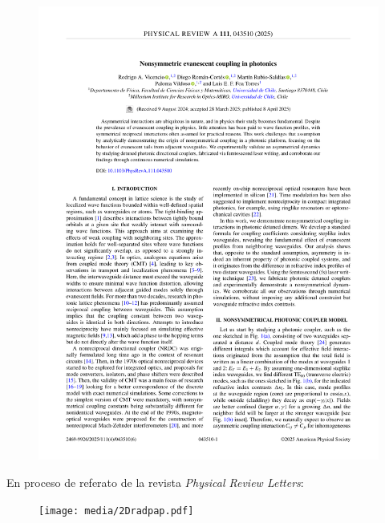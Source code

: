 \begin{figure}[H]
	\centering
	\includegraphics[page=1, width=\linewidth]{media/nonsympap.pdf}
\end{figure}
\newpage
En proceso de referato de la revista \textit{Physical Review Letters}:
\begin{figure}[H]
	\centering
	\texttt{[image: media/2Dradpap.pdf]}
\end{figure}